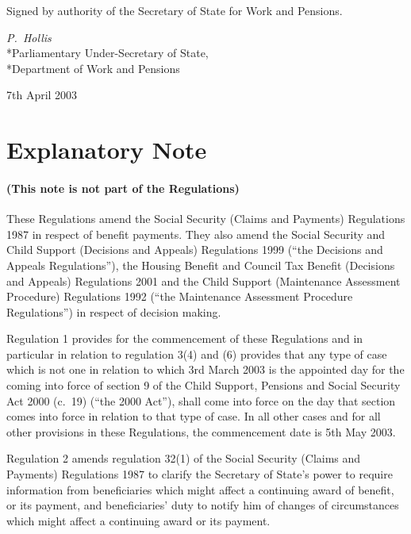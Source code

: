 \documentclass[12pt,a4paper]{article}
\begin{document}
Signed 
by authority of the Secretary of State for Work and Pensions.

{\raggedleft
\emph{P.~Hollis}\\*Parliamentary Under-Secretary of State,\\*Department of Work and Pensions

}


7th April 2003

\small

\part{Explanatory Note}

\renewcommand\parthead{— Explanatory Note}

\subsection*{(This note is not part of the Regulations)}

These Regulations amend the Social Security (Claims and Payments) Regulations 1987 in respect of benefit payments. They also amend the Social Security and Child Support (Decisions and Appeals) Regulations 1999 (“the Decisions and Appeals Regulations”), the Housing Benefit and Council Tax Benefit (Decisions and Appeals) Regulations 2001 and the Child Support (Maintenance Assessment Procedure) Regulations 1992 (“the Maintenance Assessment Procedure Regulations”) in respect of decision making.

Regulation 1 provides for the commencement of these Regulations and in particular in relation to regulation 3(4) and (6) provides that any type of case which is not one in relation to which 3rd March 2003 is the appointed day for the coming into force of section 9 of the Child Support, Pensions and Social Security Act 2000 (c.\ 19) (“the 2000 Act”), shall come into force on the day that section comes into force in relation to that type of case. In all other cases and for all other provisions in these Regulations, the commencement date is 5th May 2003.

Regulation 2 amends regulation 32(1) of the Social Security (Claims and Payments) Regulations 1987 to clarify the Secretary of State’s power to require information from beneficiaries which might affect a continuing award of benefit, or its payment, and beneficiaries' duty to notify him of changes of circumstances which might affect a continuing award or its payment.
\end{document}
